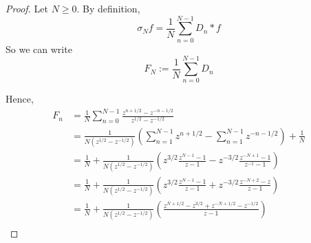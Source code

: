 \documentclass{owmaths}
\begin{document}
\begin{proof}
    Let $N \geq 0$. By definition, 
    \begin{equation*}
        \sigma_N f = \frac{1}{N} \sum_{n=0}^{N-1} D_n * f
    \end{equation*}
    So we can write
    \begin{equation*}
        F_N := \frac{1}{N} \sum_{n=0}^{N-1} D_n
    \end{equation*}
    
    Hence,
    \begin{align*} 
        F_n &= \frac{1}{N}\sum_{n=0}^{N-1} \frac{z^{n+1/2}-z^{-n-1/2}}{z^{1/2}-z^{-1/2}}\\
        &= \frac{1}{N(z^{1/2}-z^{-1/2})}\left( \sum_{n=1}^{N-1} z^{n+1/2} -\sum_{n=1}^{N-1} z^{-n-1/2}   \right) + \frac{1}{N}\\
        &= \frac{1}{N} + \frac{1}{N(z^{1/2}-z^{-1/2})}\left( z^{3/2} \frac{z^{N-1}-1}{z-1} - z^{-3/2}\frac{z^{-N+1}-1}{z^{-1}-1} \right)\\
        &= \frac{1}{N} + \frac{1}{N(z^{1/2}-z^{-1/2})}\left(z^{3/2} \frac{z^{N-1}-1}{z-1} + z^{-3/2}\frac{z^{-N+2}-z}{z-1} \right)\\
        &= \frac{1}{N}+ \frac{1}{N(z^{1/2}-z^{-1/2})}\left( \frac{z^{N+1/2}-z^{3/2} + z^{-N+1/2}-z^{-1/2}}{z-1} \right)\\

\end{align*}
\end{proof}
\end{document}
